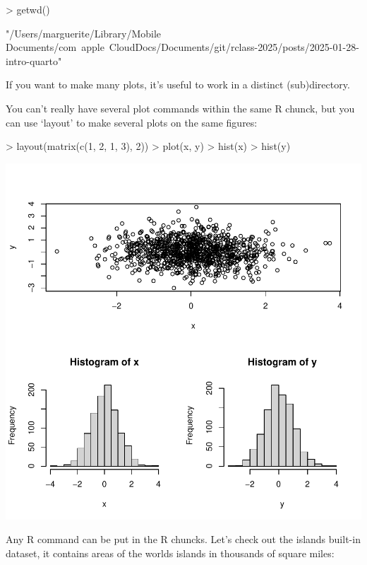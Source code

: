 \documentclass[a4paper]{article}
\begin{document}
\begin{Schunk}
\begin{Sinput}
> getwd()
\end{Sinput}
\begin{Soutput}
[1] "/Users/marguerite/Library/Mobile Documents/com~apple~CloudDocs/Documents/git/rclass-2025/posts/2025-01-28-intro-quarto"
\end{Soutput}
\end{Schunk}

If you want to make many plots, it's useful to work in a distinct (sub)directory.

You can't really have several plot commands within the same R chunck,
but you can use `layout' to make several plots on the same figures:

\begin{Schunk}
\begin{Sinput}
> layout(matrix(c(1, 2, 1, 3), 2))
> plot(x, y)
> hist(x)
> hist(y)
\end{Sinput}
\end{Schunk}
\includegraphics{Little_Sweave-007}

Any R command can be put in the R chuncks. Let's check out the islands built-in dataset, it contains areas of the worlds islands in thousands of square miles:
\end{document}
